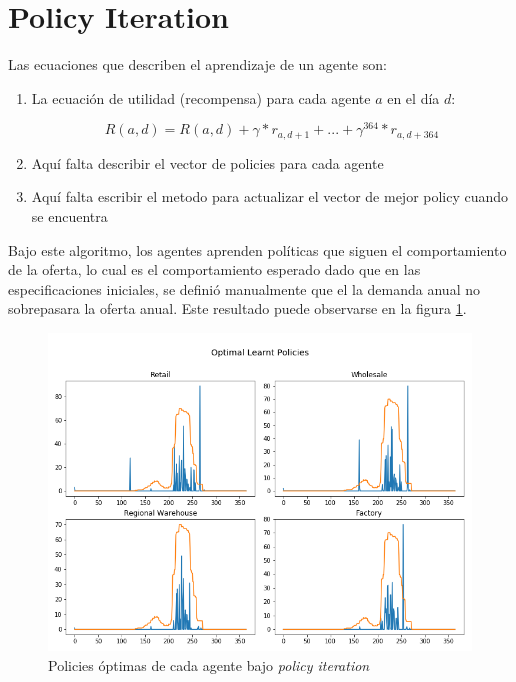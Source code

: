 \section{Policy Iteration}

Las ecuaciones que describen el aprendizaje de un agente son:

\begin{enumerate}
    \item La ecuaci\'on de utilidad (recompensa) para cada agente $a$ en el d\'ia $d$:

$$
R(a, d) = R(a,d) + \gamma*r_{a, d+1} + ... + \gamma^{364}*r_{a,d+364}
$$

    \item Aqu\'i falta describir el vector de policies para cada agente
    \item Aqu\'i falta escribir el metodo para actualizar el vector de mejor policy cuando se encuentra
\end{enumerate}

Bajo este algoritmo, los agentes aprenden pol\'iticas que siguen el comportamiento de la oferta, lo cual es el comportamiento esperado dado que en las especificaciones iniciales, se defini\'o manualmente que el la demanda anual no sobrepasara la oferta anual. Este resultado puede observarse en la figura \ref{politer_policies}. \\

\begin{figure}[ht]
\caption{Policies \'optimas de cada agente bajo \textit{policy iteration}}
\label{politer_policies}
\includegraphics[width=15cm]{tesis_tex/figs/policyiteration_policies.png}
\centering
\end{figure}


